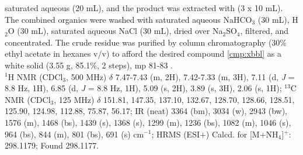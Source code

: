 saturated aqueous  (20 mL), and the product was extracted with  (3 x 10 mL).
The combined organics were washed with saturated aqueous NaHCO$_3$ (30 mL), H$_2$O (30 mL),
saturated aqueous NaCl (30 mL), dried over Na$_2$SO$_4$, filtered, and concentrated. The crude
residue was purified by column chromatography (30\% ethyl acetate in hexanes v/v) to afford the
desired compound \ref{cmp:xbbl} as a white solid (3.55 g, 85.1\%, 2 steps), mp 81-83 \degc.\\
$^1$H NMR (CDCl$_3$, 500 MHz) $\delta$ 7.47-7.43 (m, 2H), 7.42-7.33 (m, 3H), 7.11 (d, \textit{J} = 8.8 Hz, 1H),
6.85 (d, \textit{J} = 8.8 Hz, 1H), 5.09 (s, 2H), 3.89 (s, 3H), 2.06 (s, 1H);
$^{13}$C NMR (CDCl$_3$, 125 MHz) $\delta$ 151.81, 147.35, 137.10, 132.67, 128.70, 128.66, 128.51, 125.90, 124.98, 112.88, 75.87,
56.17; IR (neat) 3364 (bm), 3034 (w), 2943 (bw), 1576 (m), 1468 (bs), 1439 (s), 1368 (s), 1299
(m), 1236 (bs), 1082 (m), 1046 (s), 964 (bs), 844 (m), 801 (bs), 691 (s) cm$^{-1}$; HRMS (ESI+)
Calcd. for  [M+NH$_4$]$^+$: 298.1179; Found 298.1177.

